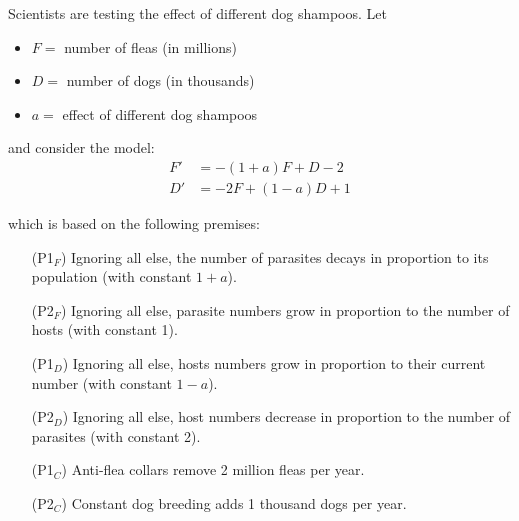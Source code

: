 

\begin{slide}

\question

\begin{problem}\label{flea_dog}
Scientists are testing the effect of different dog shampoos. Let
\begin{itemize}
	\item $F = $ number of fleas (in millions)
	\item $D = $ number of dogs (in thousands)
	\item $a = $ effect of different dog shampoos
\end{itemize}
and consider the model: %
\begin{align*}
	F' & = -(1+a)F + D - 2 \\
	D' & = -2F + (1-a)D + 1
\end{align*}

which is based on the following premises:
\begin{itemize}
	\item[(P1$_F$)] Ignoring all else, the number of parasites decays in proportion to its population (with constant $1+a$).
	\item[(P2$_F$)] Ignoring all else, parasite numbers grow in proportion to the number of hosts (with constant 1).
\begin{slidesonly}
	\vspace{3cm}
\end{slidesonly}
	\item[(P1$_D$)] Ignoring all else, hosts numbers grow in proportion to their current number (with constant $1-a$).
	\item[(P2$_D$)] Ignoring all else, host numbers decrease in proportion to the number of parasites (with constant 2).
	\item[(P1$_C$)] Anti-flea collars remove 2 million fleas per year.
	\item[(P2$_C$)] Constant dog breeding adds 1 thousand dogs per year.
\end{itemize}
\end{problem}


\end{slide}
